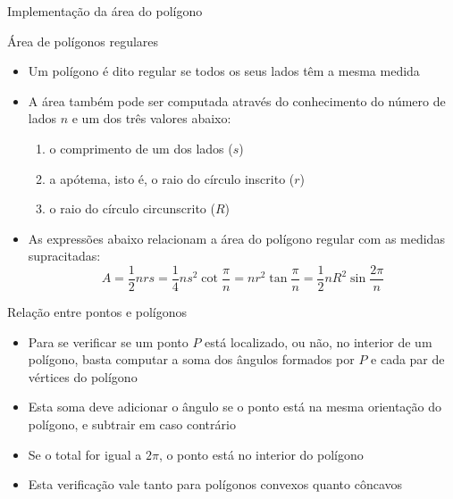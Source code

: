 \begin{frame}[fragile]{Implementação da área do polígono}
\end{frame}

\begin{frame}[fragile]{Área de polígonos regulares}

    \begin{itemize}
        \item Um polígono é dito regular se todos os seus lados têm a mesma medida
        \pause

        \item A área também pode ser computada através do conhecimento do número de lados $n$ e um 
            dos três valores abaixo:
        \pause
            \begin{enumerate}
                \item o comprimento de um dos lados ($s$)
        \pause
                \item a apótema, isto é, o raio do círculo inscrito ($r$)
        \pause
                \item o raio do círculo circunscrito ($R$)
            \end{enumerate}
        \pause

        \item As expressões abaixo relacionam a área do polígono regular com as medidas
            supracitadas:
        \[
            A = \frac{1}{2}nrs = \frac{1}{4}ns^2\cot \frac{\pi}{n} = nr^2\tan \frac{\pi}{n} = \frac{1}{2}nR^2\sin \frac{2\pi}{n}
        \]

    \end{itemize}

\end{frame}

\begin{frame}[fragile]{Relação entre pontos e polígonos}

    \begin{itemize}
        \item Para se verificar se um ponto $P$ está localizado, ou não, no interior de um 
            polígono, basta computar a soma dos ângulos formados por $P$ e cada par de vértices do 
            polígono
        \pause

        \item Esta soma deve adicionar o ângulo se o ponto está na mesma orientação do polígono, e
        subtrair em caso contrário
        \pause

        \item Se o total for igual a $2\pi$, o ponto está no interior do polígono
        \pause

        \item Esta verificação vale tanto para polígonos convexos quanto côncavos

    \end{itemize}

\end{frame}

